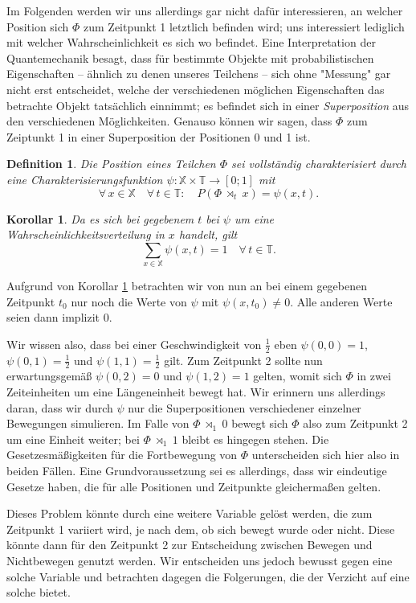 \documentclass[a4paper,12pt,ngerman]{scrartcl}
\theoremstyle{plain}
\newtheorem{definition}{Definition}
\theoremstyle{plain}
\theoremstyle{plain}
\theoremstyle{plain}
\newtheorem{corollary}{Korollar}
\newcommand{\T}{\mathbb{T}}
\newcommand{\X}{\mathbb{X}}
\newcommand{\at}[1]{\;\rtimes_{#1}\;}
\begin{document}
Im Folgenden werden wir uns allerdings gar nicht dafür interessieren, an welcher Position sich $\Phi$ zum Zeitpunkt 1 letztlich befinden wird; uns interessiert lediglich mit welcher Wahrscheinlichkeit es sich wo befindet. Eine Interpretation der Quantemechanik besagt, dass für bestimmte Objekte mit probabilistischen Eigenschaften -- ähnlich zu denen unseres Teilchens -- sich ohne "Messung" gar nicht erst entscheidet, welche der verschiedenen möglichen Eigenschaften das betrachte Objekt tatsächlich einnimmt; es befindet sich in einer \textit{Superposition} aus den verschiedenen Möglichkeiten. Genauso können wir sagen, dass $\Phi$ zum Zeiptunkt 1 in einer Superposition der Positionen 0 und 1 ist.

\begin{definition}\label{def_psi}
Die Position eines Teilchen $\Phi$ sei vollständig charakterisiert durch eine Charakterisierungsfunktion $\psi: \X\times\T \rightarrow [0;1]$ mit
\[\forall\, x\in\X\quad\forall\, t\in\T:\quad
P(\Phi\at{t}x)=\psi(x,t).\]
\end{definition}

\begin{corollary}\label{cor_summe}
Da es sich bei gegebenem $t$ bei $\psi$ um eine Wahrscheinlichkeitsverteilung in $x$ handelt, gilt
\[\sum_{x\in\X} \psi(x,t)=1 \quad\forall\,t\in\T.\]
\end{corollary}

Aufgrund von Korollar \ref{cor_summe} betrachten wir von nun an bei einem gegebenen Zeitpunkt $t_0$ nur noch die Werte von $\psi$ mit $\psi(x,t_0)\neq0$. Alle anderen Werte seien dann implizit 0.

Wir wissen also, dass bei einer Geschwindigkeit von $\frac{1}{2}$  eben $\psi(0,0)=1$, $\psi(0,1)=\frac{1}{2}$ und $\psi(1,1)=\frac{1}{2}$ gilt. Zum Zeitpunkt 2 sollte nun erwartungsgemäß $\psi(0,2)=0$ und $\psi(1,2)=1$ gelten, womit sich $\Phi$ in zwei Zeiteinheiten um eine Längeneinheit bewegt hat. Wir erinnern uns allerdings daran, dass wir durch $\psi$ nur die Superpositionen verschiedener einzelner Bewegungen simulieren. Im Falle von $\Phi\at{1}0$ bewegt sich $\Phi$ also zum Zeitpunkt 2 um eine Einheit weiter; bei $\Phi\at{1}1$ bleibt es hingegen stehen. Die Gesetzesmäßigkeiten für die Fortbewegung von $\Phi$ unterscheiden sich hier also in beiden Fällen. Eine Grundvoraussetzung sei es allerdings, dass wir eindeutige Gesetze haben, die für alle Positionen und Zeitpunkte gleichermaßen gelten.

Dieses Problem könnte durch eine weitere Variable gelöst werden, die zum Zeitpunkt 1 variiert wird, je nach dem, ob sich bewegt wurde oder nicht. Diese könnte dann für den Zeitpunkt 2 zur Entscheidung zwischen Bewegen und Nichtbewegen genutzt werden. Wir entscheiden uns jedoch bewusst gegen eine solche Variable und betrachten dagegen die Folgerungen, die der Verzicht auf eine solche bietet.
\end{document}
